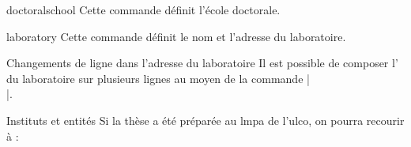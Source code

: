 %
\begin{docCommand}[doc description=\mandatory]{doctoralschool}{}
  Cette commande définit l'école doctorale.
\end{docCommand}
%
\begin{docCommand}[doc description=\mandatory]{laboratory}{}
  Cette commande définit le nom et l'adresse du laboratoire.
\end{docCommand}
%
\begin{dbremark}{Changements de ligne dans l'adresse du laboratoire}{}
  Il est possible de composer l' du laboratoire sur plusieurs
  lignes au moyen de la commande |\\|.
\end{dbremark}
%
\begin{dbexample}{Instituts et entités}{}
  Si la thèse a été préparée au \gls{lmpa} de l'\gls{ulco}, on
  pourra recourir à :
  \NoAutoSpacing%
\begin{preamblecode}[listing options={deletekeywords={[5]institute,doctoralschool}}]
\end{preamblecode}
\end{dbexample}
%
